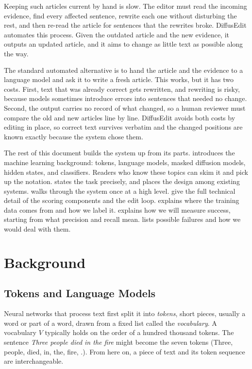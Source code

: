 \documentclass[]{paper}
\begin{document}
Keeping such articles current by hand is slow. The editor must read the incoming evidence, find every affected sentence, rewrite each one without disturbing the rest, and then re-read the article for sentences that the rewrites broke. DiffusEdit automates this process. Given the outdated article and the new evidence, it outputs an updated article, and it aims to change as little text as possible along the way.

The standard automated alternative is to hand the article and the evidence to a language model and ask it to write a fresh article. This works, but it has two costs. First, text that was already correct gets rewritten, and rewriting is risky, because models sometimes introduce errors into sentences that needed no change. Second, the output carries no record of what changed, so a human reviewer must compare the old and new articles line by line. DiffusEdit avoids both costs by editing in place, so correct text survives verbatim and the changed positions are known exactly because the system chose them.

The rest of this document builds the system up from its parts.  introduces the machine learning background: tokens, language models, masked diffusion models, hidden states, and classifiers. Readers who know these topics can skim it and pick up the notation.  states the task precisely, and  places the design among existing systems.  walks through the system once at a high level.  give the full technical detail of the scoring components and the edit loop.  explains where the training data comes from and how we label it.  explains how we will measure success, starting from what precision and recall mean.  lists possible failures and how we would deal with them.

\section{Background}
\label{sec:background}

\subsection{Tokens and Language Models}
\label{sec:lm}

Neural networks that process text first split it into \emph{tokens}, short pieces, usually a word or part of a word, drawn from a fixed list called the \emph{vocabulary}. A vocabulary $V$ typically holds on the order of a hundred thousand tokens. The sentence \emph{Three people died in the fire} might become the seven tokens (Three, people, died, in, the, fire, .). From here on, a piece of text and its token sequence are interchangeable.
\end{document}
